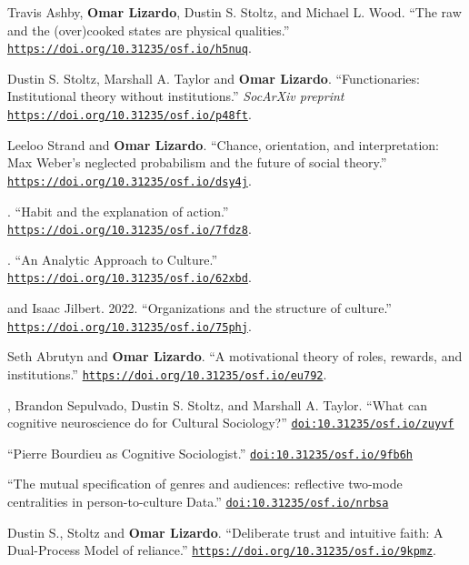 
\ind Travis Ashby, {\bf Omar Lizardo}, Dustin S. Stoltz, and Michael L. Wood. ``The raw and the (over)cooked states are physical qualities.'' \href{https://doi.org/10.31235/osf.io/h5nuq}{\nolinkurl{https://doi.org/10.31235/osf.io/h5nuq}}.

\ind Dustin S. Stoltz, Marshall A. Taylor and {\bf Omar Lizardo}. ``Functionaries: Institutional theory without institutions.'' {\em SocArXiv preprint} \href{https://doi.org/10.31235/osf.io/p48ft}{\nolinkurl{https://doi.org/10.31235/osf.io/p48ft}}.

\ind Leeloo Strand and {\bf Omar Lizardo}. ``Chance, orientation, and interpretation: Max Weber’s neglected probabilism and the future of social theory.'' \href{https://doi.org/10.31235/osf.io/dsy4j}{\nolinkurl{https://doi.org/10.31235/osf.io/dsy4j}}.

. ``Habit and the explanation of action.'' \href{https://doi.org/10.31235/osf.io/7fdz8}{\nolinkurl{https://doi.org/10.31235/osf.io/7fdz8}}.

. ``An Analytic Approach to Culture.'' \href{https://doi.org/10.31235/osf.io/62xbd}{\nolinkurl{https://doi.org/10.31235/osf.io/62xbd}}.

 and Isaac Jilbert. 2022. ``Organizations and the structure of culture.'' \href{https://doi.org/10.31235/osf.io/75phj}{\nolinkurl{https://doi.org/10.31235/osf.io/75phj}}.

\ind Seth Abrutyn and {\bf Omar Lizardo}. ``A motivational theory of roles, rewards, and institutions.'' \href{https://doi.org/10.31235/osf.io/eu792}{\nolinkurl{https://doi.org/10.31235/osf.io/eu792}}.

, Brandon Sepulvado, Dustin S. Stoltz, and Marshall A. Taylor. ``What can cognitive neuroscience do for Cultural Sociology?'' \href{https://doi.org/10.31235/osf.io/zuyvf}{\nolinkurl{doi:10.31235/osf.io/zuyvf}}

 ``Pierre Bourdieu as Cognitive Sociologist.'' \href{https://doi.org/10.31235/osf.io/9fb6h}{\nolinkurl{doi:10.31235/osf.io/9fb6h}}

 ``The mutual specification of genres and audiences: reflective two-mode centralities in person-to-culture Data.'' \href{https://doi.org/10.31235/osf.io/nrbsa}{\nolinkurl{doi:10.31235/osf.io/nrbsa}}

\ind Dustin S., Stoltz and {\bf Omar Lizardo}. ``Deliberate trust and intuitive faith: A Dual-Process Model of reliance.'' \href{https://doi.org/10.31235/osf.io/9kpmz}{\nolinkurl{https://doi.org/10.31235/osf.io/9kpmz}}.

